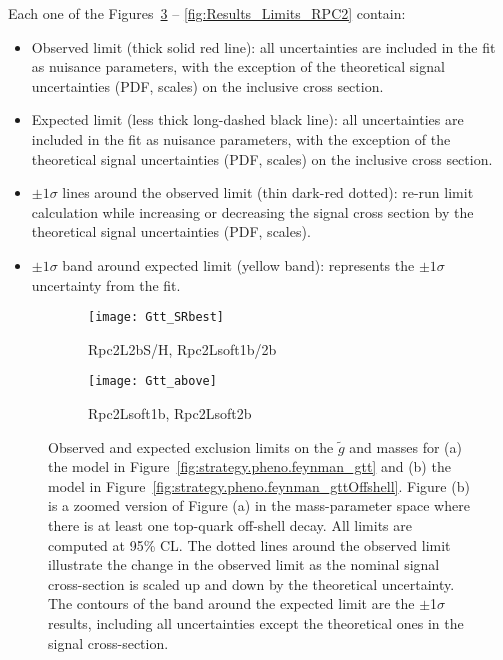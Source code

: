 Each one of the Figures~\ref{fig:Results_Limits_RPC1} -- \ref{fig:Results_Limits_RPC2} contain:
\begin{itemize}
\item Observed limit (thick solid red line): all uncertainties are included in the fit as nuisance 
parameters, with the exception of the theoretical signal uncertainties (PDF, scales) on the 
inclusive cross section.
\item Expected limit (less thick long-dashed black line): all uncertainties are included in the fit 
as nuisance parameters, with the exception of the theoretical signal uncertainties (PDF, scales) 
on the inclusive cross section. 
\item $\pm 1\sigma$ lines around the observed limit (thin dark-red dotted): re-run limit calculation
 while increasing or decreasing the signal cross section by the theoretical signal uncertainties 
  (PDF, scales).
\item $\pm 1\sigma$  band around expected limit (yellow band): represents the  $\pm 1\sigma$ 
uncertainty from the fit.
\end{itemize}

\begin{figure}[htb!]
\centering
\begin{subfigure}[t]{0.49\textwidth}\texttt{[image: Gtt\_SRbest]}\caption{Rpc2L2bS/H, Rpc2Lsoft1b/2b}\label{fig:limits_feynman_gtt}\end{subfigure}
\begin{subfigure}[t]{0.49\textwidth}\texttt{[image: Gtt\_above]}\caption{Rpc2Lsoft1b, Rpc2Lsoft2b}\label{fig:limits_feynman_gttOffshell}\end{subfigure}
\caption{Observed and expected exclusion limits on the $\tilde{g}$ and \ninoone masses for (a) the model in Figure~\ref{fig:strategy.pheno.feynman_gtt} 
and (b) the model in Figure~\ref{fig:strategy.pheno.feynman_gttOffshell}. 
Figure (b) is a zoomed version of Figure (a) in the mass-parameter space where there is at least one top-quark off-shell decay.
All limits are computed at 95\% CL. The dotted lines around the observed
limit illustrate the change in the observed limit as the nominal signal cross-section is scaled up and down
by the theoretical uncertainty. The contours of the band around the expected 
limit are the $\pm$1$\sigma$ results, 
including all uncertainties except the theoretical ones in the signal cross-section. 
}
\label{fig:Results_Limits_RPC1} 
\end{figure} 


